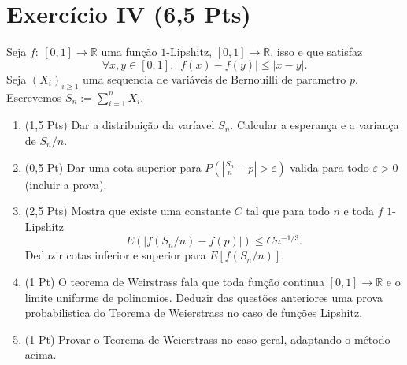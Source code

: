 \documentclass{article}
\newcommand{\bbR}{{\ensuremath{\mathbb R}} }
\newcommand{\1}[1]{{\mathbf 1}\left(#1\right)}
\newcommand{\gep}{\varepsilon}       %
\begin{document}
\section*{Exercício IV {\small(6,5 Pts)}}
Seja $f:\ [0,1]\to \bbR$ uma função $1$-Lipshitz, $[0,1]\to \bbR$. isso e que satisfaz
$$\forall x,y \in  [0,1], \ |f(x)-f(y)|\le |x-y|.$$
Seja $(X_i)_{i\ge 1}$ uma sequencia de variáveis de Bernouilli de parametro $p$. Escrevemos 
$S_n:=\sum_{i=1}^n X_i$.

\begin{enumerate}
\item (1,5 Pts) Dar a distribuição da varíavel $S_n$. Calcular a esperança e a variança de $S_n/n$.
\item (0,5 Pt) Dar uma cota superior para $P\left(|\frac{S_n}{n}-p|>\gep\right)$ valida para todo $\gep>0$ 
(incluir a prova).
\item (2,5 Pts) Mostra que existe uma constante $C$ tal que para todo $n$ e toda $f$ $1$-Lipshitz
$$E\left(|f(S_n/n)-f(p)|\right)\le C n^{-1/3}.$$
Deduzir cotas inferior e superior para  $E[f(S_n/n)].$
\item (1 Pt) O teorema de Weirstrass fala que toda função continua $[0,1]\to \bbR$ e o limite uniforme de polinomios.
Deduzir das questões anteriores uma prova probabilistica do Teorema de Weierstrass no caso de funções Lipshitz.
\item (1 Pt) Provar o Teorema de Weierstrass no caso geral, adaptando o método acima.
 
\end{enumerate}
\end{document}
